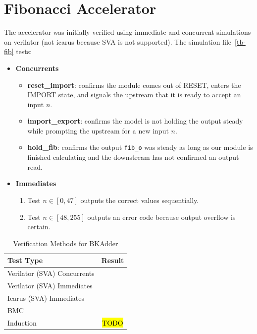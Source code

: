 \documentclass[a4paper]{report}
\begin{document}
		\section{Fibonacci Accelerator}
			The accelerator was initially verified using immediate and concurrent
			simulations on verilator (not icarus because SVA is not supported). 
			The simulation file~\ref{tb-fib} tests:

			\begin{itemize}
				\item \textbf{Concurrents}
					\begin{itemize}
						\item \textbf{reset\_import}: confirms the module comes out
							of RESET, enters the IMPORT state, and signals the upstream
							that it is ready to accept an input $n$.

						\item \textbf{import\_export}: confirms the model is not 
							holding the output steady while prompting the upstream
							for a new input $n$.

						\item \textbf{hold\_fib}: confirms the output \texttt{fib\_o} was
							steady as long as our module is finished calculating and the downstream
							has not confirmed an output read.
					\end{itemize}

				\item \textbf{Immediates}
					\begin{enumerate}
						\item Test $n \in [0,47]$ outputs the correct values sequentially.
						\item Test $n \in [48,255]$ outputs an error code because output overflow is certain.
					\end{enumerate}
			\end{itemize}

			\begin{table}[H]
				\centering
				\begin{tabular}{lc}
					\toprule
					\textbf{Test Type} & \textbf{Result} \\
					\midrule
						Verilator (SVA) Concurrents & \checkmark\\\midrule
						Verilator (SVA) Immediates& \checkmark\\\midrule
						Icarus (SVA) Immediates& \checkmark\\\midrule
						BMC & \checkmark\\\midrule
						Induction & \XSolidBrush\hl{TODO}\\
					\bottomrule
				\end{tabular}
				\caption{Verification Methods for BKAdder}
			\end{table}
\end{document}
